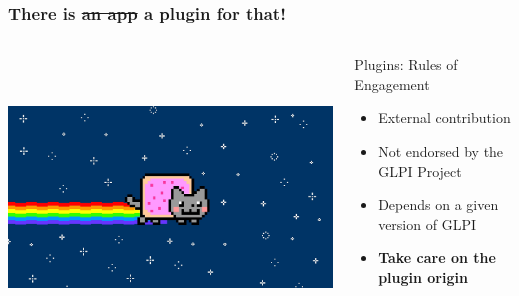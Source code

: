 \documentclass{beamer}
\begin{document}
\begin{frame}

    \frametitle{\textbf{There is \sout{an app} a plugin for that!}}

 \begin{columns}
 \begin{column}{0.45\textwidth}
         \includegraphics[height=7.5cm]{./pics/nyancat.jpg}
 \end{column}
 \begin{column}{0.65\textwidth}
    \begin{block}{Plugins: Rules of Engagement}
        \begin{itemize}
            \item External contribution
            \item Not endorsed by the GLPI Project
            \item Depends on a given version of GLPI
            \pause
            \item \textbf{Take care on the plugin origin} 
        \end{itemize}
    \end{block}

 \end{column}
\end{columns}

\end{frame}
\end{document}

